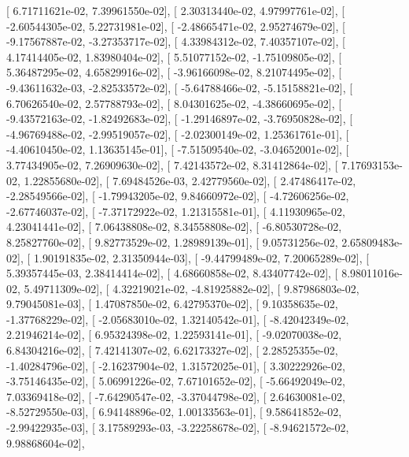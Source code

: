 \documentclass{article}
\begin{document}
       [  6.71711621e-02,   7.39961550e-02],
       [  2.30313440e-02,   4.97997761e-02],
       [ -2.60544305e-02,   5.22731981e-02],
       [ -2.48665471e-02,   2.95274679e-02],
       [ -9.17567887e-02,  -3.27353717e-02],
       [  4.33984312e-02,   7.40357107e-02],
       [  4.17414405e-02,   1.83980404e-02],
       [  5.51077152e-02,  -1.75109805e-02],
       [  5.36487295e-02,   4.65829916e-02],
       [ -3.96166098e-02,   8.21074495e-02],
       [ -9.43611632e-03,  -2.82533572e-02],
       [ -5.64788466e-02,  -5.15158821e-02],
       [  6.70626540e-02,   2.57788793e-02],
       [  8.04301625e-02,  -4.38660695e-02],
       [ -9.43572163e-02,  -1.82492683e-02],
       [ -1.29146897e-02,  -3.76950828e-02],
       [ -4.96769488e-02,  -2.99519057e-02],
       [ -2.02300149e-02,   1.25361761e-01],
       [ -4.40610450e-02,   1.13635145e-01],
       [ -7.51509540e-02,  -3.04652001e-02],
       [  3.77434905e-02,   7.26909630e-02],
       [  7.42143572e-02,   8.31412864e-02],
       [  7.17693153e-02,   1.22855680e-02],
       [  7.69484526e-03,   2.42779560e-02],
       [  2.47486417e-02,  -2.28549566e-02],
       [ -1.79943205e-02,   9.84660972e-02],
       [ -4.72606256e-02,  -2.67746037e-02],
       [ -7.37172922e-02,   1.21315581e-01],
       [  4.11930965e-02,   4.23041441e-02],
       [  7.06438808e-02,   8.34558808e-02],
       [ -6.80530728e-02,   8.25827760e-02],
       [  9.82773529e-02,   1.28989139e-01],
       [  9.05731256e-02,   2.65809483e-02],
       [  1.90191835e-02,   2.31350944e-03],
       [ -9.44799489e-02,   7.20065289e-02],
       [  5.39357445e-03,   2.38414414e-02],
       [  4.68660858e-02,   8.43407742e-02],
       [  8.98011016e-02,   5.49711309e-02],
       [  4.32219021e-02,  -4.81925882e-02],
       [  9.87986803e-02,   9.79045081e-03],
       [  1.47087850e-02,   6.42795370e-02],
       [  9.10358635e-02,  -1.37768229e-02],
       [ -2.05683010e-02,   1.32140542e-01],
       [ -8.42042349e-02,   2.21946214e-02],
       [  6.95324398e-02,   1.22593141e-01],
       [ -9.02070038e-02,   6.84304216e-02],
       [  7.42141307e-02,   6.62173327e-02],
       [  2.28525355e-02,  -1.40284796e-02],
       [ -2.16237904e-02,   1.31572025e-01],
       [  3.30222926e-02,  -3.75146435e-02],
       [  5.06991226e-02,   7.67101652e-02],
       [ -5.66492049e-02,   7.03369418e-02],
       [ -7.64290547e-02,  -3.37044798e-02],
       [  2.64630081e-02,  -8.52729550e-03],
       [  6.94148896e-02,   1.00133563e-01],
       [  9.58641852e-02,  -2.99422935e-03],
       [  3.17589293e-03,  -3.22258678e-02],
       [ -8.94621572e-02,   9.98868604e-02],
\end{document}
